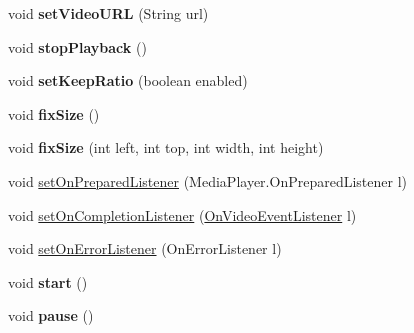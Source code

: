 \begin{DoxyCompactItemize}
void {\bfseries set\+Video\+U\+RL} (String url)
\item 
\mbox{\label{classorg_1_1cocos2dx_1_1lib_1_1Cocos2dxVideoView_a0e4e25e30423970591688c0d92c7b51b}} 
void {\bfseries stop\+Playback} ()
\item 
\mbox{\label{classorg_1_1cocos2dx_1_1lib_1_1Cocos2dxVideoView_a64fe52e924a3bf8f7274ec71695c9392}} 
void {\bfseries set\+Keep\+Ratio} (boolean enabled)
\item 
\mbox{\label{classorg_1_1cocos2dx_1_1lib_1_1Cocos2dxVideoView_a633e74716128efed6bc877a90ada817c}} 
void {\bfseries fix\+Size} ()
\item 
\mbox{\label{classorg_1_1cocos2dx_1_1lib_1_1Cocos2dxVideoView_acdab01e2fdb684ebb7004aad55ce0c5b}} 
void {\bfseries fix\+Size} (int left, int top, int width, int height)
\item 
void \hyperlink{classorg_1_1cocos2dx_1_1lib_1_1Cocos2dxVideoView_a34adbafe6cb1d475874ac9ffbde8d0cd}{set\+On\+Prepared\+Listener} (Media\+Player.\+On\+Prepared\+Listener l)
\item 
void \hyperlink{classorg_1_1cocos2dx_1_1lib_1_1Cocos2dxVideoView_a42d8619e270321b37f24918674176cb2}{set\+On\+Completion\+Listener} (\hyperlink{interfaceorg_1_1cocos2dx_1_1lib_1_1Cocos2dxVideoView_1_1OnVideoEventListener}{On\+Video\+Event\+Listener} l)
\item 
void \hyperlink{classorg_1_1cocos2dx_1_1lib_1_1Cocos2dxVideoView_ac5f2089004a7a80db645ff05bec002ac}{set\+On\+Error\+Listener} (On\+Error\+Listener l)
\item 
\mbox{\label{classorg_1_1cocos2dx_1_1lib_1_1Cocos2dxVideoView_a15d78dce9d345f8773cf5d25e082a7ef}} 
void {\bfseries start} ()
\item 
\mbox{\label{classorg_1_1cocos2dx_1_1lib_1_1Cocos2dxVideoView_a583ffefe0f87e3e8552e9eb3e10aad11}} 
void {\bfseries pause} ()
\item 
\mbox{\label{classorg_1_1cocos2dx_1_1lib_1_1Cocos2dxVideoView_ab3585be4406934507d3ab77f03c7cbff}} 

\end{DoxyCompactItemize}
